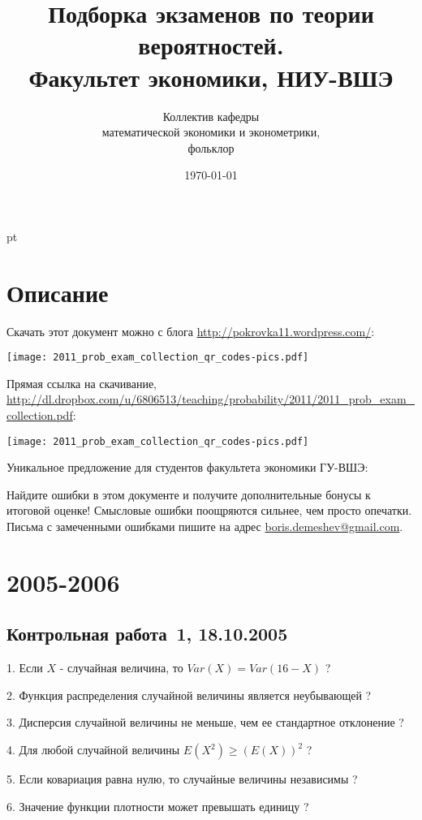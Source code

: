 \documentclass[pdftex,12pt,a4paper]{article}
\title{Подборка экзаменов по теории вероятностей. \\Факультет экономики, НИУ-ВШЭ}
\date{\today}
\author{Коллектив кафедры \\
математической экономики и эконометрики,\\
 фольклор}
\begin{document}
\maketitle

\tableofcontents{}


 pt %

\section{Описание}

Скачать этот документ можно с блога \url{http://pokrovka11.wordpress.com/}:

\texttt{[image: 2011\_prob\_exam\_collection\_qr\_codes-pics.pdf]}

Прямая ссылка на скачивание,
\url{http://dl.dropbox.com/u/6806513/teaching/probability/2011/2011_prob_exam_collection.pdf}:

\texttt{[image: 2011\_prob\_exam\_collection\_qr\_codes-pics.pdf]}

Уникальное предложение для студентов факультета экономики ГУ-ВШЭ:


Найдите ошибки в этом документе и получите дополнительные бонусы к итоговой оценке! Смысловые ошибки поощряются сильнее, чем просто опечатки. Письма с замеченными ошибками пишите на адрес \href{mailto:boris.demeshev@gmail.com}{boris.demeshev@gmail.com}.

\newpage


\section{2005-2006}


\subsection{Контрольная работа \No\,1, 18.10.2005}

1. Если  $X$  - случайная величина, то  $Var\left(X\right)=Var\left(16-X\right)$  ?

2. Функция распределения случайной величины является неубывающей ?

3. Дисперсия случайной величины не меньше, чем ее стандартное отклонение ?

4. Для любой случайной величины  $E\left(X^{2} \right)\ge \left(E\left(X\right)\right)^{2} $  ?

5. Если ковариация равна нулю, то случайные величины независимы ?

6. Значение функции плотности может превышать единицу ?
\end{document}
